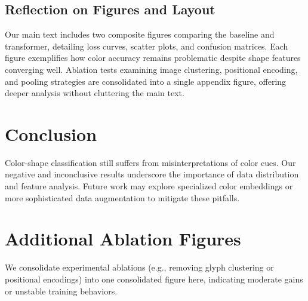 \documentclass{article}
\begin{document}
\subsection*{Reflection on Figures and Layout}
Our main text includes two composite figures comparing the baseline and transformer, detailing loss curves, scatter plots, and confusion matrices. Each figure exemplifies how color accuracy remains problematic despite shape features converging well. Ablation tests examining image clustering, positional encoding, and pooling strategies are consolidated into a single appendix figure, offering deeper analysis without cluttering the main text.

\section{Conclusion}
Color-shape classification still suffers from misinterpretations of color cues. Our negative and inconclusive results underscore the importance of data distribution and feature analysis. Future work may explore specialized color embeddings or more sophisticated data augmentation to mitigate these pitfalls.




\appendix
\section{Additional Ablation Figures}
We consolidate experimental ablations (e.g., removing glyph clustering or positional encodings) into one consolidated figure here, indicating moderate gains or unstable training behaviors.
\end{document}
